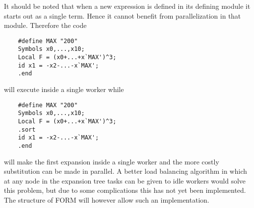 It should be noted that when a new expression is defined in its defining 
module it starts out as a single term. Hence it cannot benefit from 
parallelization in that module. Therefore the code
\begin{verbatim}
    #define MAX "200"
    Symbols x0,...,x10;
    Local F = (x0+...+x`MAX')^3;
    id x1 = -x2-...-x`MAX';
    .end
\end{verbatim}
will execute inside a single worker while
\begin{verbatim}
    #define MAX "200"
    Symbols x0,...,x10;
    Local F = (x0+...+x`MAX')^3;
    .sort
    id x1 = -x2-...-x`MAX';
    .end
\end{verbatim}
will make the first expansion inside a single worker and the more costly 
substitution can be made in parallel. A better load 
balancing algorithm in which at any node in the expansion tree tasks can be 
given to idle workers would solve this problem, but due to some 
complications this has not yet been implemented. The structure of FORM will 
however allow such an implementation.



